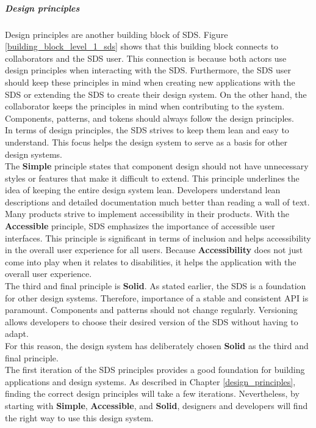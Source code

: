 \subparagraph{Design principles}
Design principles are another building block of \ac{SDS}. Figure \ref{building_block_level_1_sds} shows that this building block connects to collaborators and the \ac{SDS} user. This connection is because both actors use design principles when interacting with the \ac{SDS}. Furthermore, the \ac{SDS} user should keep these principles in mind when creating new applications with the \ac{SDS} or extending the \ac{SDS} to create their design system. On the other hand, the collaborator keeps the principles in mind when contributing to the system. Components, patterns, and tokens should always follow the design principles. \\
In terms of design principles, the \ac{SDS} strives to keep them lean and easy to understand. This focus helps the design system to serve as a basis for other design systems. \\
The \textbf{Simple} principle states that component design should not have unnecessary styles or features that make it difficult to extend. This principle underlines the idea of keeping the entire design system lean. Developers understand lean descriptions and detailed documentation much better than reading a wall of text. \\
Many products strive to implement accessibility in their products. With the \textbf{Accessible} principle, \ac{SDS} emphasizes the importance of accessible user interfaces. This principle is significant in terms of inclusion and helps accessibility in the overall user experience for all users. Because \textbf{Accessibility} does not just come into play when it relates to disabilities, it helps the application with the overall user experience. \\
The third and final principle is \textbf{Solid}. As stated earlier, the \ac{SDS} is a foundation for other design systems. Therefore, importance of a stable and consistent \ac{API} is paramount. Components and patterns should not change regularly. Versioning allows developers to choose their desired version of the \ac{SDS} without having to adapt. \\
For this reason, the design system has deliberately chosen \textbf{Solid} as the third and final principle. \\
The first iteration of the \acl{SDS} principles provides a good foundation for building applications and design systems. As described in Chapter \ref{design_principles}, finding the correct design principles will take a few iterations. Nevertheless, by starting with \textbf{Simple}, \textbf{Accessible}, and \textbf{Solid}, designers and developers will find the right way to use this design system.

